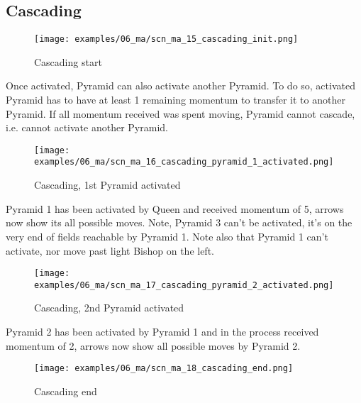 \subsection*{Cascading}
\label{sec:Mayan Ascendancy/Pyramid/Cascading}

\noindent
\begin{figure}[!h]
\texttt{[image: examples/06\_ma/scn\_ma\_15\_cascading\_init.png]}
\caption{Cascading start}
\label{fig:scn_ma_15_cascading_init}
\end{figure}

Once activated, Pyramid can also activate another Pyramid. To do so, activated
Pyramid has to have at least 1 remaining momentum to transfer it to another
Pyramid. If all momentum received was spent moving, Pyramid cannot cascade, i.e.
cannot activate another Pyramid.

\clearpage %

\noindent
\begin{figure}[!h]
\texttt{[image: examples/06\_ma/scn\_ma\_16\_cascading\_pyramid\_1\_activated.png]}
\caption{Cascading, 1st Pyramid activated}
\label{fig:scn_ma_16_cascading_pyramid_1_activated}
\end{figure}

Pyramid 1 has been activated by Queen and received momentum of 5, arrows now show
its all possible moves. Note, Pyramid 3 can't be activated, it's on the very end
of fields reachable by Pyramid 1. Note also that Pyramid 1 can't activate, nor move
past light Bishop on the left.

\clearpage %

\noindent
\begin{figure}[!h]
\texttt{[image: examples/06\_ma/scn\_ma\_17\_cascading\_pyramid\_2\_activated.png]}
\caption{Cascading, 2nd Pyramid activated}
\label{fig:scn_ma_17_cascading_pyramid_2_activated}
\end{figure}

Pyramid 2 has been activated by Pyramid 1 and in the process received momentum of 2,
arrows now show all possible moves by Pyramid 2.

\clearpage %

\noindent
\begin{figure}[!h]
\texttt{[image: examples/06\_ma/scn\_ma\_18\_cascading\_end.png]}
\caption{Cascading end}
\label{fig:scn_ma_18_cascading_end}
\end{figure}

